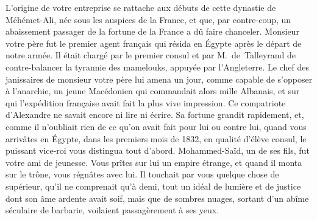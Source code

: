 \documentclass[french,twoside]{book} %
\newcommand\orgName[1]{#1}
\newcommand\persName[1]{#1}
\newcommand\placeName[1]{#1}
\begin{document}
L’origine de votre entreprise se rattache aux débuts de cette dynastie de {\persName Méhémet-Ali}, née sous les auspices de la {\placeName France}, et que, par contre-coup, un abaissement passager de la fortune de la {\orgName France} a dû faire chanceler. Monsieur votre père fut le premier agent français qui résida en {\placeName Égypte} après le départ de notre armée. Il était chargé par le premier consul et par {\persName M. de Talleyrand} de contre-balancer la tyrannie des {\orgName mamelouks}, appuyée par l’{\orgName Angleterre}. Le chef des janissaires de monsieur votre père lui amena un jour, comme capable de s’opposer à l’anarchie, un jeune Macédonien qui commandait alors mille Albanais, et sur qui l’expédition française avait fait la plus vive impression. Ce compatriote d’{\persName Alexandre} ne savait encore ni lire ni écrire. Sa fortune grandit rapidement, et, comme il n’oubliait rien de ce qu’on avait fait pour lui ou contre lui, quand vous arrivâtes en Égypte, dans les premiers mois de 1832, en qualité d’élève consul, le puissant vice-roi vous distingua tout d’abord. {\persName Mohammed-Saïd}, un de ses fils, fut votre ami de jeunesse. Vous prîtes sur lui un empire étrange, et quand il monta sur le trône, vous régnâtes avec lui. Il touchait par vous quelque chose de supérieur, qu’il ne comprenait qu’à demi, tout un idéal de lumière et de justice dont son âme ardente avait soif, mais que de sombres nuages, sortant d’un abîme séculaire de barbarie, voilaient passagèrement à ses yeux.\par
\end{document}
